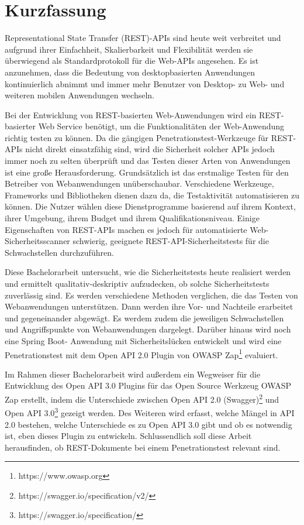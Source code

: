 \chapter{\textbf{Kurzfassung}}

Representational State Transfer (REST)-APIs sind heute weit verbreitet und aufgrund ihrer Einfachheit, Skalierbarkeit und Flexibilität werden sie überwiegend als Standardprotokoll für die Web-APIs angesehen. Es ist anzunehmen, dass die Bedeutung von desktopbasierten Anwendungen kontinuierlich abnimmt und immer mehr Benutzer von Desktop- zu Web- und weiteren mobilen Anwendungen wechseln.

Bei der Entwicklung von REST-basierten Web-Anwendungen wird ein REST-basierter Web Service benötigt, um die Funktionalitäten der Web-Anwendung richtig testen zu können. Da die gängigen Penetrationstest-Werkzeuge für REST-APIs nicht direkt einsatzfähig sind, wird die Sicherheit solcher APIs jedoch immer noch zu selten überprüft und das Testen dieser Arten von Anwendungen ist eine große Herausforderung. Grundsätzlich ist das erstmalige Testen für den Betreiber von Webanwendungen unüberschaubar. Verschiedene Werkzeuge, Frameworks und Bibliotheken dienen dazu da, die Testaktivität automatisieren zu können. Die Nutzer wählen diese Dienstprogramme basierend auf ihrem Kontext, ihrer Umgebung, ihrem Budget und ihrem Qualifikationsniveau. Einige Eigenschaften von REST-APIs machen es jedoch für automatisierte Web-Sicherheitsscanner schwierig, geeignete REST-API-Sicherheitstests für die Schwachstellen durchzuführen.

Diese Bachelorarbeit untersucht, wie die Sicherheitstests heute realisiert werden und ermittelt qualitativ-deskriptiv aufzudecken, ob solche Sicherheitstests zuverlässig sind. Es werden verschiedene Methoden verglichen, die das Testen von Webanwendungen unterstützen. Dann werden ihre Vor- und Nachteile erarbeitet und gegeneinander abgewägt. Es werdem zudem die jeweiligen Schwachstellen und Angriffspunkte von Webanwendungen dargelegt. Darüber hinaus wird noch eine Spring Boot- Anwendung mit Sicherheitslücken entwickelt und wird eine Penetrationstest mit dem Open API 2.0 Plugin von OWASP Zap\footnote{https://www.owasp.org} evaluiert.

Im Rahmen dieser Bachelorarbeit wird außerdem ein Wegweiser für die Entwicklung des Open API 3.0 Plugins für das Open Source Werkzeug OWASP Zap erstellt, indem die Unterschiede zwischen Open API 2.0 (Swagger)\footnote{https://swagger.io/specification/v2/} und Open API 3.0\footnote{https://swagger.io/specification/} gezeigt werden. Des Weiteren wird erfasst, welche Mängel in API 2.0 bestehen, welche Unterschiede es zu Open API 3.0 gibt und ob es notwendig ist, eben dieses Plugin zu entwickeln. Schlussendlich soll diese Arbeit herausfinden, ob REST-Dokumente bei einem Penetrationstest relevant sind.